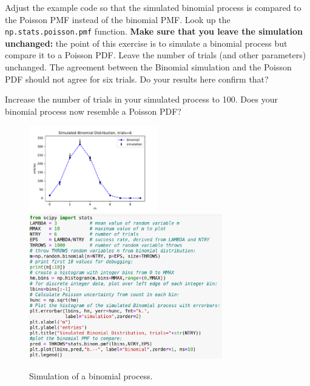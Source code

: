 \begin{samepage}
\begin{plot} \end{plot}
Adjust the example code so that the simulated binomial process is
compared to the Poisson PMF instead of the binomial PMF.  Look up the
{\tt np.stats.poisson.pmf} function.  {\bf Make sure that you leave
  the simulation unchanged:} the point of this exercise is to simulate
a binomial process but compare it to a Poisson PDF.  Leave the number
of trials (and other parameters) unchanged.  The agreement between the
Binomial simulation and the Poisson PDF should not agree for six
trials.  Do your results here confirm that?
\end{samepage}

\begin{samepage}
\begin{plot} \end{plot}
Increase the number of trials in your simulated process to 100.  Does
your binomial process now resemble a Poisson PDF?
\end{samepage}

\begin{figure}[htbp]
\begin{center}
  \includegraphics[width=0.50\textwidth]{figs/labs/limits/binomial.pdf}
  \includegraphics[width=0.75\textwidth]{figs/labs/limits/binomial-code.png} 
\caption{Simulation of a binomial process.}
\label{fig:binom}
\end{center}
\end{figure}

